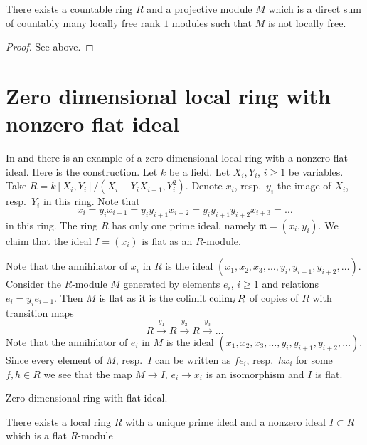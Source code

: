 \begin{lemma}
\label{lemma-projective-not-locally-free}
There exists a countable ring $R$ and a projective module $M$
which is a direct sum of countably many locally free rank $1$
modules such that $M$ is not locally free.
\end{lemma}

\begin{proof}
See above.
\end{proof}







\section{Zero dimensional local ring with nonzero flat ideal}
\label{section-zero-dimensional-flat-ideal}

\noindent
In \cite{Lazard} and \cite{Autour}
there is an example of a zero dimensional local ring with a
nonzero flat ideal. Here is the construction. Let $k$ be a field.
Let $X_i, Y_i$, $i \geq 1$ be variables. Take
$R = k[X_i, Y_i]/(X_i - Y_i X_{i + 1}, Y_i^2)$. Denote $x_i$, resp.\ $y_i$
the image of $X_i$, resp.\ $Y_i$ in this ring. Note that
$$
x_i = y_i x_{i + 1} = y_i y_{i +1} x_{i + 2} =
y_i y_{i + 1} y_{i + 2} x_{i + 3} = \ldots
$$
in this ring. The ring $R$ has only
one prime ideal, namely $\mathfrak m = (x_i, y_i)$. We claim that
the ideal $I = (x_i)$ is flat as an $R$-module.

\medskip\noindent
Note that the annihilator of $x_i$ in $R$ is the ideal
$(x_1, x_2, x_3, \ldots, y_i, y_{i + 1}, y_{i + 2}, \ldots)$.
Consider the $R$-module $M$ generated by elements $e_i$, $i \geq 1$ and
relations $e_i = y_i e_{i + 1}$. Then $M$ is flat as it is the
colimit $\mathop{\mathrm{colim}}\nolimits_i R$ of copies of $R$ with transition maps
$$
R \xrightarrow{y_1} R \xrightarrow{y_2} R \xrightarrow{y_3} \ldots
$$
Note that the annihilator of $e_i$ in $M$ is the ideal
$(x_1, x_2, x_3, \ldots, y_i, y_{i + 1}, y_{i + 2}, \ldots)$.
Since every element of $M$, resp.\ $I$ can be written as
$f e_i$, resp.\ $h x_i$ for some $f, h \in R$ we see that the
map $M \to I$, $e_i \to x_i$ is an isomorphism and $I$ is flat.

\begin{lemma}
\label{lemma-zero-dimensional-flat-ideal}
\begin{slogan}
Zero dimensional ring with flat ideal.
\end{slogan}
There exists a local ring $R$ with a unique prime ideal
and a nonzero ideal $I \subset R$ which is a flat $R$-module
\end{lemma}

